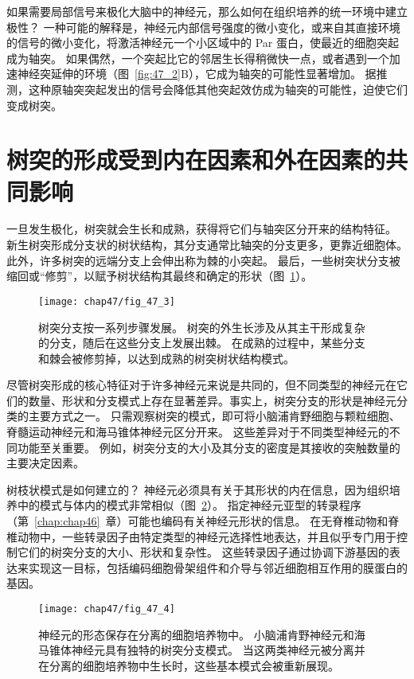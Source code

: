 如果需要局部信号来极化大脑中的神经元，那么如何在组织培养的统一环境中建立极性？
一种可能的解释是，神经元内部信号强度的微小变化，或来自其直接环境的信号的微小变化，将激活神经元一个小区域中的 Par 蛋白，使最近的细胞突起成为轴突。
如果偶然，一个突起比它的邻居生长得稍微快一点，或者遇到一个加速神经突延伸的环境（图~\ref{fig:47_2}B），它成为轴突的可能性显著增加。
据推测，这种原轴突突起发出的信号会降低其他突起效仿成为轴突的可能性，迫使它们变成树突。



\section{树突的形成受到内在因素和外在因素的共同影响}

一旦发生极化，树突就会生长和成熟，获得将它们与轴突区分开来的结构特征。
新生树突形成分支状的树状结构，其分支通常比轴突的分支更多，更靠近细胞体。
此外，许多树突的远端分支上会伸出称为棘的小突起。
最后，一些树突状分支被缩回或“修剪”，以赋予树状结构其最终和确定的形状（图~\ref{fig:47_3}）。


\begin{figure}[htbp]
	\centering
	\texttt{[image: chap47/fig\_47\_3]}
	\caption{树突分支按一系列步骤发展。
		树突的外生长涉及从其主干形成复杂的分支，随后在这些分支上发展出棘。
		在成熟的过程中，某些分支和棘会被修剪掉，以达到成熟的树突树状结构模式。}
	\label{fig:47_3}
\end{figure}


尽管树突形成的核心特征对于许多神经元来说是共同的，但不同类型的神经元在它们的数量、形状和分支模式上存在显著差异。事实上，树突分支的形状是神经元分类的主要方式之一。
只需观察树突的模式，即可将小脑浦肯野细胞与颗粒细胞、脊髓运动神经元和海马锥体神经元区分开来。
这些差异对于不同类型神经元的不同功能至关重要。
例如，树突分支的大小及其分支的密度是其接收的突触数量的主要决定因素。


树枝状模式是如何建立的？
神经元必须具有关于其形状的内在信息，因为组织培养中的模式与体内的模式非常相似（图~\ref{fig:47_4}）。
指定神经元亚型的转录程序（第~\ref{chap:chap46}~章）可能也编码有关神经元形状的信息。
在无脊椎动物和脊椎动物中，一些转录因子由特定类型的神经元选择性地表达，并且似乎专门用于控制它们的树突分支的大小、形状和复杂性。
这些转录因子通过协调下游基因的表达来实现这一目标，包括编码细胞骨架组件和介导与邻近细胞相互作用的膜蛋白的基因。


\begin{figure}[htbp]
	\centering
	\texttt{[image: chap47/fig\_47\_4]}
	\caption{神经元的形态保存在分离的细胞培养物中。
		小脑浦肯野神经元和海马锥体神经元具有独特的树突分支模式。
		当这两类神经元被分离并在分离的细胞培养物中生长时，这些基本模式会被重新展现。}
	\label{fig:47_4}
\end{figure}


